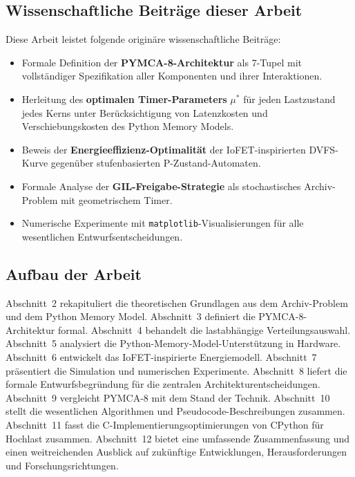 ﻿\documentclass[a4paper,12pt]{scrreprt}
\theoremstyle{definition}
\begin{document}
	\subsection{Wissenschaftliche Beiträge dieser Arbeit}
	
	Diese Arbeit leistet folgende originäre wissenschaftliche Beiträge:
	
	\begin{itemize}[noitemsep]
		\item Formale Definition der \textbf{PYMCA-8-Architektur} als
		7-Tupel mit vollständiger Spezifikation aller Komponenten und
		ihrer Interaktionen.
		\item Herleitung des \textbf{optimalen Timer-Parameters} $\mu^*$ für
		jeden Lastzustand jedes Kerns unter Berücksichtigung von
		Latenzkosten und Verschiebungskosten des Python Memory Models.
		\item Beweis der \textbf{Energieeffizienz-Optimalität} der IoFET-inspirierten
		DVFS-Kurve gegenüber stufenbasierten P-Zustand-Automaten.
		\item Formale Analyse der \textbf{GIL-Freigabe-Strategie} als
		stochastisches Archiv-Problem mit geometrischem Timer.
		\item Numerische Experimente mit \texttt{matplotlib}-Visualisierungen
		für alle wesentlichen Entwurfsentscheidungen.
	\end{itemize}
	
	\subsection{Aufbau der Arbeit}

	Abschnitt~2 rekapituliert die theoretischen Grundlagen aus dem Archiv-Problem und dem Python Memory Model.
	Abschnitt~3 definiert die PYMCA-8-Architektur formal.
	Abschnitt~4 behandelt die lastabhängige Verteilungsauswahl.
	Abschnitt~5 analysiert die Python-Memory-Model-Unterstützung in Hardware.
	Abschnitt~6 entwickelt das IoFET-inspirierte Energiemodell.
	Abschnitt~7 präsentiert die Simulation und numerischen Experimente.
	Abschnitt~8 liefert die formale Entwurfsbegründung für die zentralen Architekturentscheidungen.
	Abschnitt~9 vergleicht PYMCA-8 mit dem Stand der Technik.
	Abschnitt~10 stellt die wesentlichen Algorithmen und Pseudocode-Beschreibungen zusammen.
	Abschnitt~11 fasst die C-Implementierungsoptimierungen von CPython für Hochlast zusammen.
	Abschnitt~12 bietet eine umfassende Zusammenfassung und einen weitreichenden Ausblick auf zukünftige Entwicklungen, Herausforderungen und Forschungsrichtungen.
	
\end{document}
